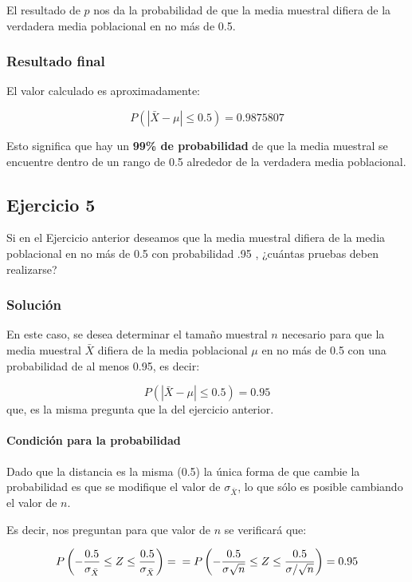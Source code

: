 \documentclass[
]{article}
\begin{document}
El resultado de \(p\) nos da la probabilidad de que la media muestral difiera de la verdadera media poblacional en no más de 0.5.

\subsubsection{Resultado final}\label{resultado-final}

El valor calculado es aproximadamente:

\[
P(|\bar{X} - \mu| \leq 0.5) = 0.9875807
\]

Esto significa que hay un \textbf{99\% de probabilidad} de que la media muestral se encuentre dentro de un rango de 0.5 alrededor de la verdadera media poblacional.

\subsection{Ejercicio 5}\label{ejercicio-5-1}

Si en el Ejercicio anterior deseamos que la media muestral difiera de la media poblacional en no más de 0.5 con probabilidad .95 , ¿cuántas pruebas deben realizarse?

\subsubsection{Solución}\label{soluciuxf3n-8}

En este caso, se desea determinar el tamaño muestral \(n\) necesario para que la media muestral \(\bar{X}\) difiera de la media poblacional \(\mu\) en no más de 0.5 con una probabilidad de al menos 0.95, es decir:

\[
P(|\bar{X} - \mu| \leq 0.5) = 0.95
\]
que, es la misma pregunta que la del ejercicio anterior.

\paragraph{Condición para la probabilidad}\label{condiciuxf3n-para-la-probabilidad}

Dado que la distancia es la misma (0.5) la única forma de que cambie la probabilidad es que se modifique el valor de \(\sigma_{\bar{X}}\), lo que sólo es posible cambiando el valor de \(n\).

Es decir, nos preguntan para que valor de \(n\) se verificará que:

\[
P\left(-\frac{0.5}{\sigma_{\bar{X}}} \leq Z \leq \frac{0.5}{\sigma_{\bar{X}}}\right) = \\ = P\left(-\frac{0.5}{\sigma\sqrt{n}} \leq Z \leq \frac{0.5}{\sigma/\sqrt{n}}\right)  = 0.95
\]
\end{document}
